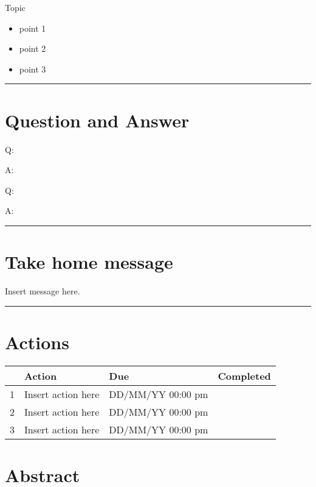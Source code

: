 \documentclass[
]{book}
\providecommand{\tightlist}{%
  \setlength{\itemsep}{0pt}\setlength{\parskip}{0pt}}
\begin{document}
Topic

\begin{itemize}
\tightlist
\item
  point 1
\item
  point 2
\item
  point 3
\end{itemize}

\begin{center}\rule{0.5\linewidth}{0.5pt}\end{center}

\hypertarget{question-and-answer-31}{%
\section*{Question and Answer}\label{question-and-answer-31}}

Q:

A:

Q:

A:

\begin{center}\rule{0.5\linewidth}{0.5pt}\end{center}

\hypertarget{take-home-message-31}{%
\section*{Take home message}\label{take-home-message-31}}

Insert message here.

\begin{center}\rule{0.5\linewidth}{0.5pt}\end{center}

\hypertarget{actions-31}{%
\section*{Actions}\label{actions-31}}

\begin{longtable}[]{@{}llll@{}}
\toprule
& Action & Due & Completed\tabularnewline
\midrule
\endhead
1 & Insert action here & DD/MM/YY 00:00 pm &\tabularnewline
2 & Insert action here & DD/MM/YY 00:00 pm &\tabularnewline
3 & Insert action here & DD/MM/YY 00:00 pm &\tabularnewline
\bottomrule
\end{longtable}

\hypertarget{abstract-32}{%
\section*{Abstract}\label{abstract-32}}
\end{document}
